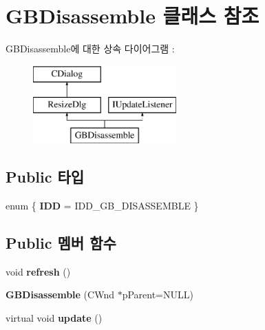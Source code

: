 \hypertarget{class_g_b_disassemble}{}\section{G\+B\+Disassemble 클래스 참조}
\label{class_g_b_disassemble}
G\+B\+Disassemble에 대한 상속 다이어그램 \+: \begin{figure}[H]
\begin{center}
\leavevmode
\includegraphics[height=3.000000cm]{class_g_b_disassemble}
\end{center}
\end{figure}
\subsection*{Public 타입}
\begin{DoxyCompactItemize}
\item 
\mbox{\label{class_g_b_disassemble_a7af15be4d057c5f04b6b51c5e8011416}} 
enum \{ {\bfseries I\+DD} = I\+D\+D\+\_\+\+G\+B\+\_\+\+D\+I\+S\+A\+S\+S\+E\+M\+B\+LE
 \}
\end{DoxyCompactItemize}
\subsection*{Public 멤버 함수}
\begin{DoxyCompactItemize}
\item 
\mbox{\label{class_g_b_disassemble_a0ae217c08ead8a3cf62c59dadaa27fde}} 
void {\bfseries refresh} ()
\item 
\mbox{\label{class_g_b_disassemble_a64795e9c53d508a948db15b940e707e5}} 
{\bfseries G\+B\+Disassemble} (C\+Wnd $\ast$p\+Parent=N\+U\+LL)
\item 
\mbox{\label{class_g_b_disassemble_a1170fe51e14d0b770f5200bf4e193423}} 
virtual void {\bfseries update} ()
\end{DoxyCompactItemize}
